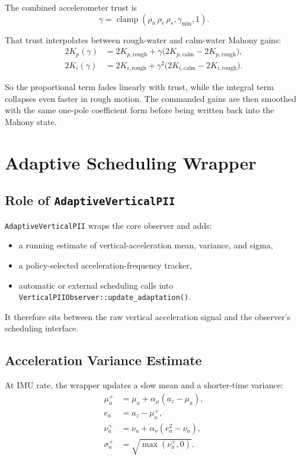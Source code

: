 \documentclass[conference]{IEEEtran}
\DeclareMathOperator{\clamp}{clamp}
\begin{document}
The combined accelerometer trust is
\begin{equation}
\gamma = \clamp(\rho_n\,\rho_e\,\rho_s,\gamma_{\min},1).
\end{equation}

That trust interpolates between rough-water and calm-water Mahony gains:
\begin{align}
2K_p(\gamma)
&=
2K_{p,\mathrm{rough}} +
\gamma\bigl(2K_{p,\mathrm{calm}}-2K_{p,\mathrm{rough}}\bigr),\\
2K_i(\gamma)
&=
2K_{i,\mathrm{rough}} +
\gamma^2\bigl(2K_{i,\mathrm{calm}}-2K_{i,\mathrm{rough}}\bigr).
\end{align}

So the proportional term fades linearly with trust, while the integral term
collapses even faster in rough motion. The commanded gains are then smoothed
with the same one-pole coefficient form before being written back into the
Mahony state.

\section{Adaptive Scheduling Wrapper}\label{sec:adaptive}

\subsection{Role of \texttt{AdaptiveVerticalPII}}

\texttt{AdaptiveVerticalPII} wraps the core observer and adds:
\begin{itemize}[leftmargin=1.4em]
  \item a running estimate of vertical-acceleration mean, variance, and sigma,
  \item a policy-selected acceleration-frequency tracker,
  \item automatic or external scheduling calls into
        \texttt{VerticalPIIObserver::update\_adaptation()}.
\end{itemize}

It therefore sits between the raw vertical acceleration signal and the
observer’s scheduling interface.

\subsection{Acceleration Variance Estimate}

At IMU rate, the wrapper updates a slow mean and a shorter-time variance:
\begin{align}
\mu_a^{+} &= \mu_a + \alpha_\mu(a_z-\mu_a),\\
e_a &= a_z - \mu_a^{+},\\
\nu_a^{+} &= \nu_a + \alpha_\nu(e_a^2 - \nu_a),\\
\sigma_a^{+} &= \sqrt{\max(\nu_a^{+},0)}.
\end{align}
\end{document}
